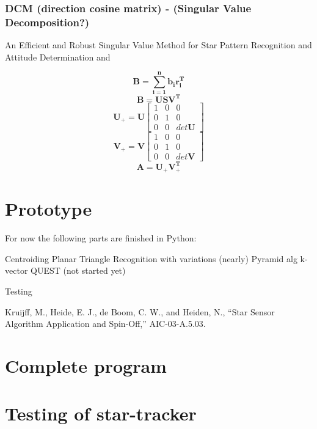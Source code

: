 \documentclass[12pt,a4paper,oneside]{article}
\begin{document}
\subsubsection{DCM (direction cosine matrix) - (Singular Value Decomposition?)}
An Efficient and Robust Singular Value Method for Star Pattern Recognition and Attitude Determination
 and

\cite{6187242}
\begin{equation}
\bm{B = \sum_{i=1}^nb_ir_i^T}
\end{equation}
\begin{equation}
\bm{B = USV^T}
\end{equation}
\begin{equation}
\bm{U}_+ = \bm{U}\begin{bmatrix}
1 & 0 & 0 \\
0 & 1 & 0 \\
0 & 0 & det\bm{U}
\end{bmatrix}
\end{equation}
\begin{equation}
\bm{V}_+ = \bm{V}\begin{bmatrix}
1 & 0 & 0 \\
0 & 1 & 0 \\
0 & 0 & det\bm{V}
\end{bmatrix}
\end{equation}
\begin{equation}
\bm{A = U_+V_+^T}
\end{equation}
\newpage
\section{Prototype}
For now the following parts are finished in Python:
\begin{enumerate}
Centroiding
Planar Triangle Recognition with variations (nearly)
Pyramid alg
k-vector
QUEST (not started yet)
\end{enumerate}
Testing\par
Kruijff, M., Heide, E. J., de Boom, C. W., and Heiden, N., “Star Sensor Algorithm
Application and Spin-Off,” AIC-03-A.5.03.
\newpage
\section{Complete program}

\newpage
\section{Testing of star-tracker}
\cite{RIS_0}
\end{document}
